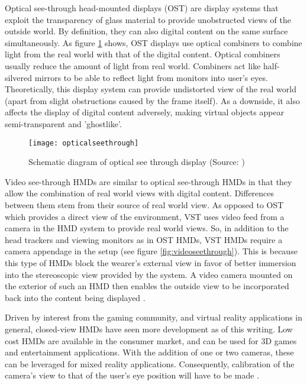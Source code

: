 Optical see-through head-mounted displays (OST) are display systems that exploit the transparency of glass material to provide unobstructed views of the outside world. By definition, they can also digital content on the same surface simultaneously. As figure \ref{fig:opticalseethrough} shows, OST displays use optical combiners to combine light from the real world with that of the digital content. Optical combiners usually reduce the amount of light from real world. Combiners act like half-silvered mirrors to be able to reflect light from monitors into user's eyes. Theoretically, this display system can provide undistorted view of the real world (apart from slight obstructions caused by the frame itself). As a downside, it also affects the display of digital content adversely, making virtual objects appear semi-transparent and 'ghostlike'.

\begin{figure}
	\centering
	\texttt{[image: opticalseethrough]}
	\caption{Schematic diagram of optical see through display (Source: \cite{azuma1997survey})}
	\label{fig:opticalseethrough}
\end{figure}

Video see-through HMDs are similar to optical see-through HMDs in that they allow the combination of real world views with digital content. Differences between them stem from their source of real world view. As opposed to OST which provides a direct view of the environment, VST uses video feed from a camera in the HMD system to provide real world views. So, in addition to the head trackers and viewing monitors as in OST HMDs, VST HMDs require a camera appendage in the setup (see figure \ref{fig:videoseethrough}). This is because this type of HMDs block the wearer's external view in favor of better immersion into the stereoscopic view provided by the system. A video camera mounted on the exterior of such an HMD then enables the outside view to be incorporated back into the content being displayed . 

Driven by interest from the gaming community, and virtual reality applications in general, closed-view HMDs have seen more development as of this writing. Low cost HMDs are available in the consumer market, and can be used for 3D games and entertainment applications. With the addition of one or two cameras, these can be leveraged for mixed reality applications. Consequently, calibration of the camera's view to that of the user's eye position will have to be made .

